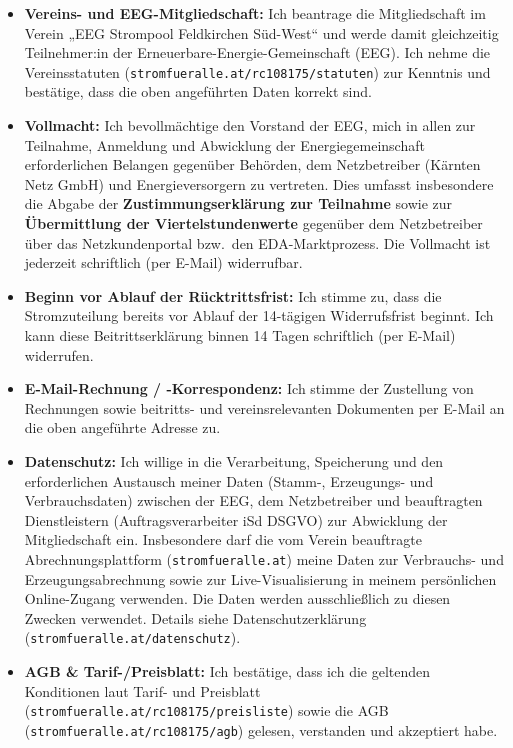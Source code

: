 \documentclass[10pt]{article}
\begin{document}
{\footnotesize

\begin{itemize}[
    label=\textcolor{boxgray}{$\square$},
    leftmargin=1.5em,
    labelsep=0.6em,
    itemsep=1.5pt,
    topsep=2pt,
    parsep=0pt
]

\item
\textbf{Vereins- und EEG-Mitgliedschaft:}
Ich beantrage die Mitgliedschaft im Verein
„EEG Strompool Feldkirchen Süd-West“ und werde damit gleichzeitig
Teilnehmer:in der Erneuerbare-Energie-Gemeinschaft (EEG). Ich nehme die
Vereinsstatuten
(\texttt{stromfueralle.at/rc108175/statuten}) zur Kenntnis und bestätige,
dass die oben angeführten Daten korrekt sind.

\item
\textbf{Vollmacht:}
Ich bevollmächtige den Vorstand der EEG, mich in allen zur Teilnahme,
Anmeldung und Abwicklung der Energiegemeinschaft erforderlichen Belangen
gegenüber Behörden, dem Netzbetreiber (Kärnten Netz GmbH) und
Energieversorgern zu vertreten. Dies umfasst insbesondere die Abgabe der
\textbf{Zustimmungserklärung zur Teilnahme} sowie zur
\textbf{Übermittlung der Viertelstundenwerte} gegenüber dem Netzbetreiber
über das Netzkundenportal bzw.\ den EDA-Marktprozess. Die Vollmacht ist
jederzeit schriftlich (per E-Mail) widerrufbar.

\item
\textbf{Beginn vor Ablauf der Rücktrittsfrist:}
Ich stimme zu, dass die Stromzuteilung bereits vor Ablauf der
14-tägigen Widerrufsfrist beginnt. Ich kann diese Beitrittserklärung
binnen 14 Tagen schriftlich (per E-Mail) widerrufen.

\item
\textbf{E-Mail-Rechnung / -Korrespondenz:}
Ich stimme der Zustellung von Rechnungen sowie beitritts- und
vereinsrelevanten Dokumenten per E-Mail an die oben angeführte Adresse
zu.

\item
\textbf{Datenschutz:}
Ich willige in die Verarbeitung, Speicherung und den erforderlichen
Austausch meiner Daten (Stamm-, Erzeugungs- und Verbrauchsdaten)
zwischen der EEG, dem Netzbetreiber und beauftragten Dienstleistern
(Auftragsverarbeiter iSd DSGVO) zur Abwicklung der Mitgliedschaft ein.
Insbesondere darf die vom Verein beauftragte Abrechnungsplattform
(\texttt{stromfueralle.at}) meine Daten zur Verbrauchs- und
Erzeugungsabrechnung sowie zur Live-Visualisierung in meinem
persönlichen Online-Zugang verwenden. Die Daten werden ausschließlich zu
diesen Zwecken verwendet. Details siehe Datenschutzerklärung
(\texttt{stromfueralle.at/datenschutz}).

\item
\textbf{AGB \& Tarif-/Preisblatt:}
Ich bestätige, dass ich die geltenden Konditionen laut Tarif- und
Preisblatt
(\texttt{stromfueralle.at/rc108175/preisliste})
sowie die AGB
(\texttt{stromfueralle.at/rc108175/agb})
gelesen, verstanden und akzeptiert habe.

\end{itemize}

}
\end{document}
